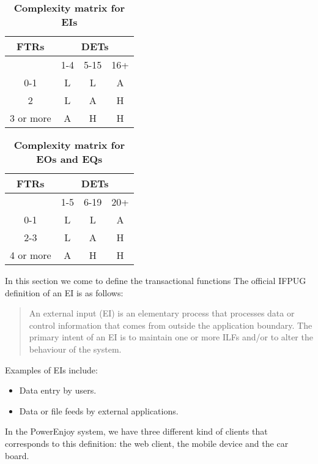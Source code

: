 \begin{longtable}{| c | c | c | c |}
	\caption{\textbf{Complexity matrix for EIs}}
	\label{tab:ei_complexity_matrix}
	\\ \hline
	
	\textbf{FTRs}  & \multicolumn{3}{c|}{\textbf{DETs}} \\ \hline
	   & 1-4  & 5-15  & 16+ \\ \hline
	0-1  & L  & L  & A \\ \hline
	2  & L  & A  & H \\ \hline
	3 or more  & A  & H  & H \\ \hline
\end{longtable}

\begin{longtable}{| c | c | c | c |}
	\caption{\textbf{Complexity matrix for EOs and EQs}}
	\label{tab:eo_eq_complexity_matrix}
	\\ \hline
	
	\textbf{FTRs}  & \multicolumn{3}{c|}{\textbf{DETs}} \\ \hline
   		 & 1-5  & 6-19  & 20+ \\ \hline 
	0-1  & L  & L  & A \\ \hline 
	2-3  & L  & A  & H \\ \hline 
	4 or more  & A  & H  & H \\ \hline 
\end{longtable}

In this section we come to define the transactional functions
The official IFPUG definition of an EI is as follows:

\begin{quote}
    An external input (EI) is an elementary process that processes data or control information that comes from outside the application boundary. The primary intent of an EI is to maintain one or more ILFs and/or to alter the behaviour of the system. 
\end{quote}
Examples of EIs include:
\begin{itemize}
    \item Data entry by users.
    \item Data or file feeds by external applications. 
\end{itemize}

In the PowerEnjoy system, we have three different kind of clients that corresponds to this definition: the web client, the mobile device and the car board.


